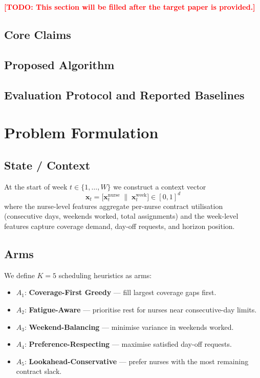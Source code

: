 \documentclass[12pt, a4paper]{article}
\newcommand{\xt}{\mathbf{x}_t}          %
\newcommand{\arm}[1]{A_{#1}}             %
\newcommand{\TODO}[1]{\textbf{\textcolor{red}{[TODO: #1]}}}
\begin{document}
\TODO{This section will be filled after the target paper is provided.}

\subsection{Core Claims}

\subsection{Proposed Algorithm}

\subsection{Evaluation Protocol and Reported Baselines}

\section{Problem Formulation}
\label{sec:formulation}

\subsection{State / Context}

At the start of week $t \in \{1, \ldots, W\}$ we construct a context vector
\begin{equation}
  \xt = \bigl[\mathbf{x}^{\text{nurse}}_t \;\|\; \mathbf{x}^{\text{week}}_t\bigr]
  \in [0,1]^d
\end{equation}
where the nurse-level features aggregate per-nurse contract utilisation
(consecutive days, weekends worked, total assignments) and the week-level
features capture coverage demand, day-off requests, and horizon position.

\subsection{Arms}

We define $K = 5$ scheduling heuristics as arms:

\begin{itemize}[leftmargin=2em]
  \item $\arm{1}$: \textbf{Coverage-First Greedy} — fill largest coverage gaps first.
  \item $\arm{2}$: \textbf{Fatigue-Aware} — prioritise rest for nurses near consecutive-day limits.
  \item $\arm{3}$: \textbf{Weekend-Balancing} — minimise variance in weekends worked.
  \item $\arm{4}$: \textbf{Preference-Respecting} — maximise satisfied day-off requests.
  \item $\arm{5}$: \textbf{Lookahead-Conservative} — prefer nurses with the most remaining contract slack.
\end{itemize}
\end{document}
